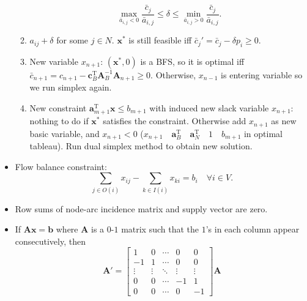 \documentclass[10pt]{article}
\begin{document}
\begin{multicols*}{3}
\begin{itemize}
\begin{enumerate}
                \begin{equation*}
                    \max_{\bar{a}_{i, j} < 0} \frac{\bar{c}_j}{\bar{a}_{i, j}} \leq \delta \leq \min_{\bar{a}_{i, j} > 0} \frac{\bar{c}_j}{\bar{a}_{i, j}}.
                \end{equation*}
                \item $a_{ij} + \delta$ for some $j \in N$. $\bm{x}^*$ is still feasible iff $\bar{c}_j' = \bar{c}_j - \delta p_i \geq 0$.
                \item New variable $x_{n + 1}$: $(\bm{x}^*, 0)$ is a BFS, so it is optimal iff $\bar{c}_{n + 1} = c_{n + 1} - \bm{c}_B^{\mathrm{T}}\bm{A}_B^{-1}\bm{A}_{n + 1} \geq 0$. Otherwise, $x_{n - 1}$ is entering variable so we run simplex again.
                \item New constraint $\bm{a}_{m + 1}^{\mathrm{T}}\bm{x} \leq b_{m + 1}$ with induced new slack variable $x_{n + 1}$: nothing to do if $\bm{x}^*$ satisfies the constraint. Otherwise add $x_{n + 1}$ as new basic variable, and $x_{n + 1} < 0$ ($x_{n + 1} \quad \bm{a}_B^{\mathrm{T}} \quad \bm{a}_N^{\mathrm{T}} \quad 1 \quad b_{m + 1}$ in optimal tableau). Run dual simplex method to obtain new solution.
            \end{enumerate}
            \item Flow balance constraint: 
            \begin{equation*}
                \sum_{j \in O(i)}x_{ij} - \sum_{k \in I(i)}x_{ki} = b_i \quad \forall i \in V.
            \end{equation*}
            \item Row sums of node-arc incidence matrix and supply vector are zero.
            \item If $\bm{Ax = b}$ where $\bm{A}$ is a $0$-$1$ matrix such that the $1$'s in each column appear consecutively, then 
            \begin{equation*}
                \bm{A}' = \begin{bmatrix}
                    1 & 0 & \cdots & 0 & 0 \\
                    -1 & 1 & \cdots & 0 & 0 \\
                    \vdots & \vdots & \ddots & \vdots & \vdots \\
                    0 & 0 & \cdots & - 1 & 1 \\
                    0 & 0 & \cdots & 0 & -1
                \end{bmatrix}\bm{A}
            \end{equation*}

\end{itemize}
\end{multicols*}
\end{document}
